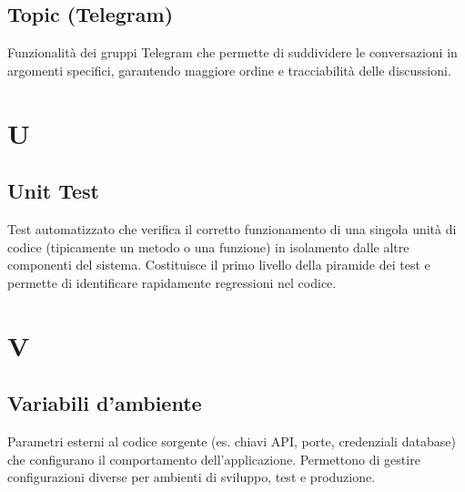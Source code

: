 \documentclass[a4paper, 11pt, oneside]{scrartcl} %
\begin{document}
\subsection*{Topic (Telegram)}


Funzionalità dei gruppi Telegram che permette di suddividere le conversazioni in argomenti specifici, garantendo maggiore ordine e tracciabilità delle discussioni.

\vspace{0.5cm}



\section*{U}


\subsection*{Unit Test}
Test automatizzato che verifica il corretto funzionamento di una singola unità di codice (tipicamente un metodo o una funzione) in isolamento dalle altre componenti del sistema. Costituisce il primo livello della piramide dei test e permette di identificare rapidamente regressioni nel codice.
\vspace{0.5cm}



\section*{V}


\subsection*{Variabili d'ambiente}


Parametri esterni al codice sorgente (es. chiavi API, porte, credenziali database) che configurano il comportamento dell'applicazione. Permettono di gestire configurazioni diverse per ambienti di sviluppo, test e produzione.

\vspace{0.5cm}
\end{document}
